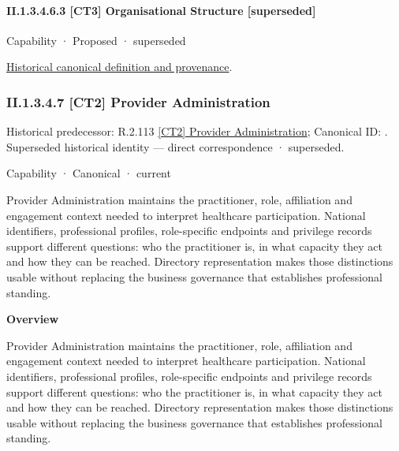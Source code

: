 \paragraph*{II.1.3.4.6.3 [CT3] Organisational Structure [superseded]}
\label{navigation:II.1.3.4.6.3}

\label{element:19d211cf601c49e5a65665330d0c5c3d}
{\small Capability · Proposed · superseded}\par
\href{../../../../../../../continuum/strategy/capability/19d211cf601c49e5a65665330d0c5c3d.md}{Historical canonical definition and provenance}.\par
\subsubsection*{II.1.3.4.7 [CT2] Provider Administration}
\label{navigation:II.1.3.4.7}

{\small Historical predecessor: R.2.113 \hyperref[element:a352fd50419d451887c85fcb98566cd5]{[CT2] Provider Administration}; Canonical ID: \texttt{}. Superseded historical identity — direct correspondence · superseded.}\par
\label{element:d6312f85968a4209bafff5ed009297a6}
{\small Capability · Canonical · current}\par

Provider Administration maintains the practitioner, role, affiliation and engagement context needed to interpret healthcare participation. National identifiers, professional profiles, role-specific endpoints and privilege records support different questions: who the practitioner is, in what capacity they act and how they can be reached. Directory representation makes those distinctions usable without replacing the business governance that establishes professional standing.



\textbf{Overview}



Provider Administration maintains the practitioner, role, affiliation and engagement context needed to interpret healthcare participation. National identifiers, professional profiles, role-specific endpoints and privilege records support different questions: who the practitioner is, in what capacity they act and how they can be reached. Directory representation makes those distinctions usable without replacing the business governance that establishes professional standing.



